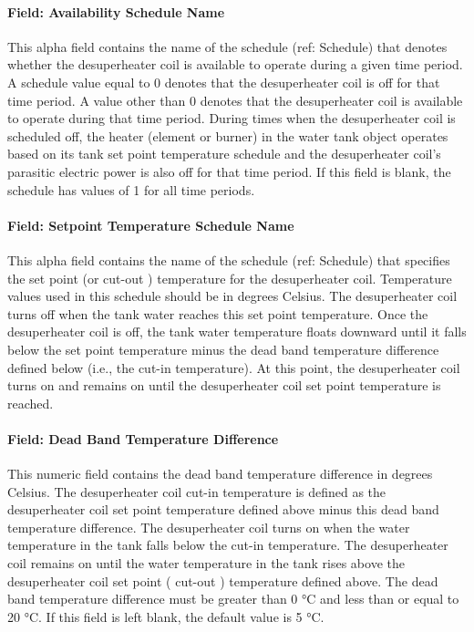 \paragraph{Field: Availability Schedule Name}\label{field-availability-schedule-name-12-000}

This alpha field contains the name of the schedule (ref: Schedule) that denotes whether the desuperheater coil is available to operate during a given time period. A schedule value equal to 0 denotes that the desuperheater coil is off for that time period. A value other than 0 denotes that the desuperheater coil is available to operate during that time period. During times when the desuperheater coil is scheduled off, the heater (element or burner) in the water tank object operates based on its tank set point temperature schedule and the desuperheater coil's parasitic electric power is also off for that time period. If this field is blank, the schedule has values of 1 for all time periods.

\paragraph{Field: Setpoint Temperature Schedule Name}\label{field-setpoint-temperature-schedule-name}

This alpha field contains the name of the schedule (ref: Schedule) that specifies the set point (or cut-out ) temperature for the desuperheater coil. Temperature values used in this schedule should be in degrees Celsius. The desuperheater coil turns off when the tank water reaches this set point temperature. Once the desuperheater coil is off, the tank water temperature floats downward until it falls below the set point temperature minus the dead band temperature difference defined below (i.e., the cut-in temperature). At this point, the desuperheater coil turns on and remains on until the desuperheater coil set point temperature is reached.

\paragraph{Field: Dead Band Temperature Difference}\label{field-dead-band-temperature-difference}

This numeric field contains the dead band temperature difference in degrees Celsius. The desuperheater coil cut-in temperature is defined as the desuperheater coil set point temperature defined above minus this dead band temperature difference. The desuperheater coil turns on when the water temperature in the tank falls below the cut-in temperature. The desuperheater coil remains on until the water temperature in the tank rises above the desuperheater coil set point ( cut-out ) temperature defined above. The dead band temperature difference must be greater than 0 °C and less than or equal to 20 °C. If this field is left blank, the default value is 5 °C.

